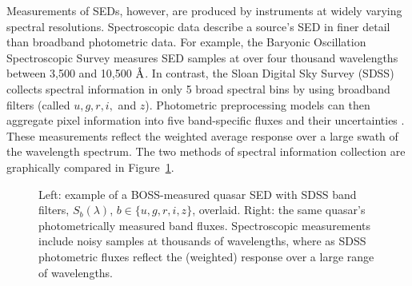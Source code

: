 \documentclass{article} %
\begin{document}
Measurements of SEDs, however, are produced by instruments at widely varying spectral resolutions.  
Spectroscopic data describe a source's SED in finer detail than broadband photometric data.  For example, the Baryonic Oscillation Spectroscopic Survey \cite{dawson2013baryon} measures SED samples at over four thousand wavelengths between 3,500 and 10,500 $\textup{\AA}$.
In contrast, the Sloan Digital Sky Survey (SDSS)~\cite{alam2015eleventh} collects spectral information in only 5 broad spectral bins by using broadband filters (called $u,g,r,i,$ and $z$).  
Photometric preprocessing models can then aggregate pixel information into five band-specific fluxes and their uncertainties \cite{stoughton2002sloan}.  
These measurements reflect the weighted average response over a large swath of the wavelength spectrum. 
The two methods of spectral information collection are graphically compared in Figure~\ref{fig:filters}. 

\begin{figure}[t]
\vskip 0in
\begin{center}
%
\vskip -0.18in
\caption{Left: example of a BOSS-measured quasar SED with SDSS band filters, $S_{b}(\lambda)$, $b \in \{u, g, r, i, z\}$, overlaid.  Right: the same quasar's photometrically measured band fluxes.  Spectroscopic measurements include noisy samples at thousands of wavelengths, where as SDSS photometric fluxes reflect the (weighted) response over a large range of wavelengths.}
\label{fig:filters}
\end{center}
\vskip -0.2in
\end{figure} 
\end{document}
